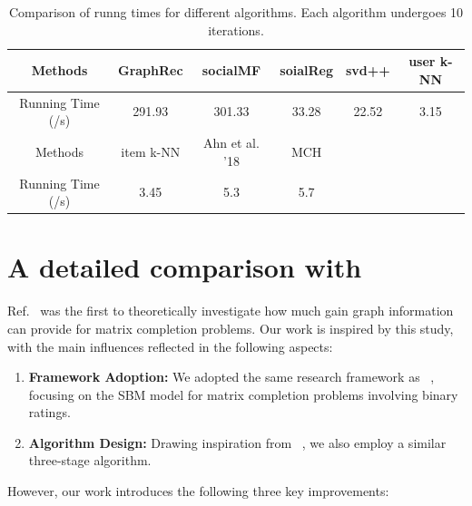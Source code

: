 \documentclass{article}
\begin{document}
\begin{table}[h]
  \centering
  \caption{Comparison of runng times for different algorithms. Each algorithm undergoes 10 iterations.}
  \label{Tab1}
  \begin{tabular}{c | c c c c c}
    \hline
    Methods & GraphRec & socialMF & soialReg & svd++ & user k-NN \\
    \hline
    Running Time (/s) & 291.93 & 301.33 & 33.28 & 22.52 & 3.15 \\
    \hline
    Methods & item k-NN & Ahn et al. '18 & MCH \\
    \hline
    Running Time (/s) & 3.45 & 5.3 & 5.7 \\
    \hline
  \end{tabular}
\end{table}

\section{A detailed comparison with~\cite{ahn2018binary}}\label{compare}
Ref.~\cite{ahn2018binary} was the first to theoretically investigate how much gain graph information can provide for matrix completion problems. Our work is inspired by this study, with the main influences reflected in the following aspects:  
\begin{enumerate}
    \item \textbf{Framework Adoption:} We adopted the same research framework as ~\cite{ahn2018binary}, focusing on the SBM model for matrix completion problems involving binary ratings. 
    \item \textbf{Algorithm Design:} Drawing inspiration from ~\cite{ahn2018binary}, we also employ a similar three-stage algorithm.
\end{enumerate} 
However, our work introduces the following three key improvements:  
\end{document}
